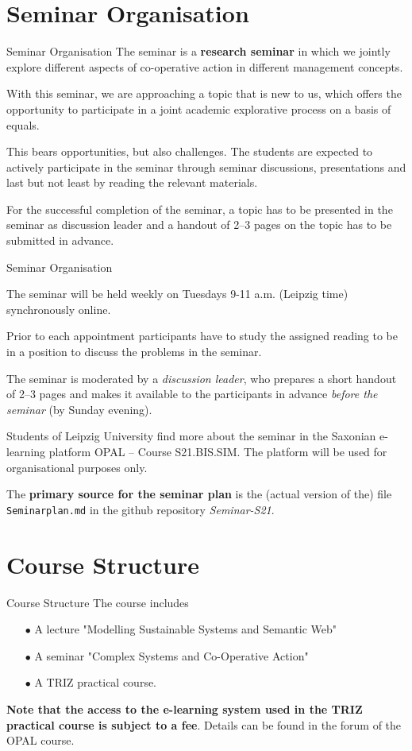 \documentclass{beamer}
\begin{document}
\section{Seminar Organisation}
\begin{frame}{Seminar Organisation}\small
The seminar is a \textbf{research seminar} in which we jointly explore
different aspects of co-operative action in different management concepts.

With this seminar, we are approaching a topic that is new to us, which offers
the opportunity to participate in a joint academic explorative process on a
basis of equals.

This bears opportunities, but also challenges.  The students are expected to
actively participate in the seminar through seminar discussions, presentations
and last but not least by reading the relevant materials.

For the successful completion of the seminar, a topic has to be presented in
the seminar as discussion leader and a handout of 2--3 pages on the topic has
to be submitted in advance.
\end{frame}

\begin{frame}{Seminar Organisation}\small

The seminar will be held weekly on Tuesdays 9-11 a.m. (Leipzig time)
synchronously online.

Prior to each appointment participants have to study the assigned reading to
be in a position to discuss the problems in the seminar.

The seminar is moderated by a \emph{discussion leader}, who prepares a short
handout of 2--3 pages and makes it available to the participants in advance
\emph{before the seminar} (by Sunday evening).

Students of Leipzig University find more about the seminar in the Saxonian
e-learning platform OPAL -- Course S21.BIS.SIM.  The platform will be used for
organisational purposes only.

The \textbf{primary source for the seminar plan} is the (actual version of
the) file \texttt{Seminarplan.md} in the github repository \emph{Seminar-S21}.
\end{frame}

\section{Course Structure}
\begin{frame}{Course Structure}
The course includes

\begin{itemize}
\item[$\bullet$] A lecture "Modelling Sustainable Systems and Semantic Web"
\item[$\bullet$] A seminar "Complex Systems and Co-Operative Action"
\item[$\bullet$] A TRIZ practical course.
\end{itemize}
\textbf{Note that the access to the e-learning system used in the TRIZ
  practical course is subject to a fee}. Details can be found in the forum of
the OPAL course.
\end{frame}
\end{document}
